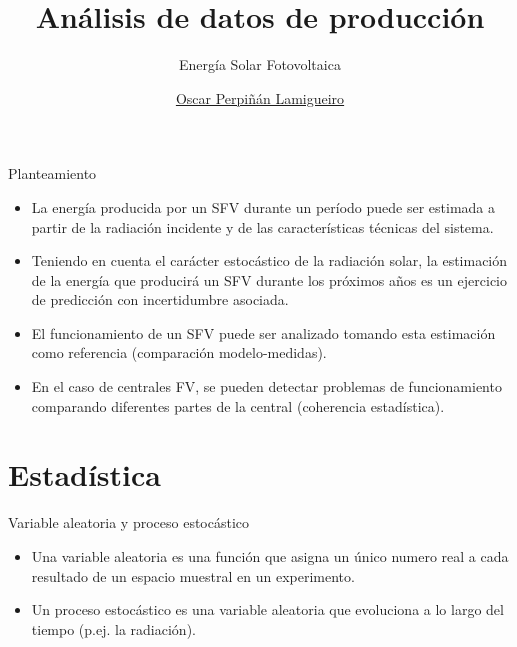 \documentclass[aspectratio=169, usenames,svgnames,dvipsnames]{beamer}
\author{\href{https://oscarperpinan.github.io}{Oscar Perpiñán Lamigueiro}}
\date{}
\title{Análisis de datos de producción}
\subtitle{Energía Solar Fotovoltaica}
\institute[UPM]{Universidad Politécnica de Madrid}
\begin{document}
\maketitle

\begin{frame}[label={sec:orga79289c}]{Planteamiento}
\begin{itemize}
\item La energía producida por un SFV durante un período puede ser estimada a partir de la radiación incidente y de las características técnicas del sistema.
\item Teniendo en cuenta el carácter estocástico de la radiación solar, la estimación de la energía que producirá un SFV durante los próximos años es un ejercicio de predicción con incertidumbre asociada.
\item El funcionamiento de un SFV puede ser analizado tomando esta estimación como referencia (\alert{comparación modelo-medidas}).
\item En el caso de centrales FV, se pueden detectar problemas de funcionamiento comparando diferentes partes de la central (\alert{coherencia estadística}).
\end{itemize}
\end{frame}

\section{Estadística}
\label{sec:org43bddeb}


\begin{frame}[label={sec:org002d3c5}]{Variable aleatoria y proceso estocástico}
\begin{itemize}
\item Una \alert{variable aleatoria} es una función que asigna un único numero
real a cada resultado de un espacio muestral en un experimento.
\item Un \alert{proceso estocástico} es una variable aleatoria que evoluciona a
lo largo del \alert{tiempo} (p.ej. la radiación).
\end{itemize}
\end{frame}
\end{document}
